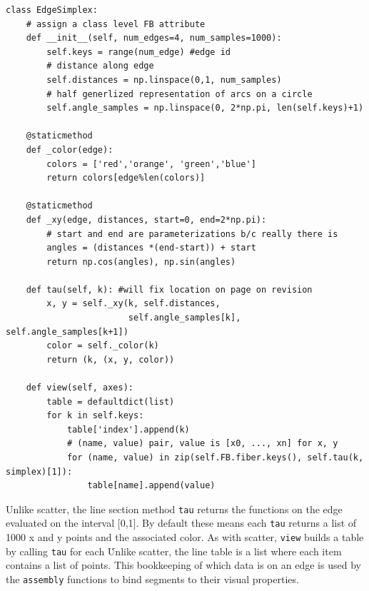 \documentclass[../main.tex]{subfiles}
\begin{document}
\begin{verbatim}
class EdgeSimplex: 
    # assign a class level FB attribute
    def __init__(self, num_edges=4, num_samples=1000): 
        self.keys = range(num_edge) #edge id
        # distance along edge
        self.distances = np.linspace(0,1, num_samples)
        # half generlized representation of arcs on a circle
        self.angle_samples = np.linspace(0, 2*np.pi, len(self.keys)+1)

    @staticmethod
    def _color(edge):
        colors = ['red','orange', 'green','blue']
        return colors[edge%len(colors)]

    @staticmethod
    def _xy(edge, distances, start=0, end=2*np.pi):
        # start and end are parameterizations b/c really there is 
        angles = (distances *(end-start)) + start
        return np.cos(angles), np.sin(angles)

    def tau(self, k): #will fix location on page on revision
        x, y = self._xy(k, self.distances, 
                        self.angle_samples[k], self.angle_samples[k+1]) 
        color = self._color(k) 
        return (k, (x, y, color))

    def view(self, axes):
        table = defaultdict(list)
        for k in self.keys:
            table['index'].append(k)
            # (name, value) pair, value is [x0, ..., xn] for x, y
            for (name, value) in zip(self.FB.fiber.keys(), self.tau(k, simplex)[1]):
                table[name].append(value)
\end{verbatim}
Unlike scatter, the line section method \texttt{tau} returns the functions on the edge evaluated on the interval [0,1]. By default these means each \texttt{tau} returns a list of 1000 x and y points and the associated color. As with scatter, \texttt{view} builds a table by calling \texttt{tau} for each \dbasepoint\. Unlike scatter, the line table is a list where each item contains a list of points. This bookkeeping of which data is on an edge is used by the \texttt{assembly} functions to bind segments to their visual properties. 
\end{document}
